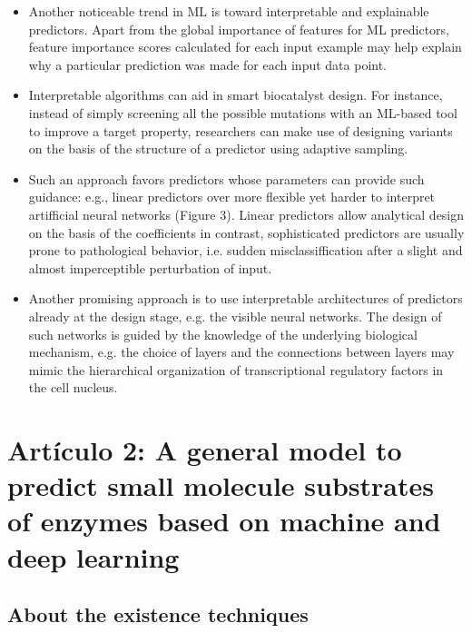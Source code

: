 \documentclass[12pt]{article}
\begin{document}
\begin{itemize}
\item Another noticeable trend in ML is toward interpretable and explainable predictors\cite{95}. Apart from the global importance of features for ML predictors, feature importance scores calculated for each input example\cite{96,97} may help explain why a particular prediction was made for each input data point. 


\item Interpretable algorithms can aid in smart biocatalyst design. For instance, instead of simply screening all the possible mutations with an ML-based tool to improve a target property, researchers can make use of designing variants on the basis of the structure of a predictor using adaptive sampling\cite{98}. 



\item Such an approach favors predictors whose parameters can provide such guidance: e.g., linear predictors over more flexible yet harder to interpret artifficial neural networks (Figure 3). Linear predictors allow analytical design on the basis of the coefficients \cite{99} in contrast, sophisticated predictors are usually prone to pathological behavior, i.e. sudden misclassiffication after a slight and almost imperceptible perturbation of input\cite{100}.


\item Another promising approach is to use interpretable architectures of predictors already at the design stage, e.g. the visible neural networks\cite{101}. The design of such networks is guided by the knowledge of the underlying biological mechanism, e.g. the choice of layers and the connections between layers may mimic the hierarchical organization of transcriptional regulatory factors in the cell nucleus.


\end{itemize}










\section{Artículo 2: A general model to predict small molecule substrates of enzymes based on machine and deep learning}

\subsection{About the existence techniques}
\end{document}
